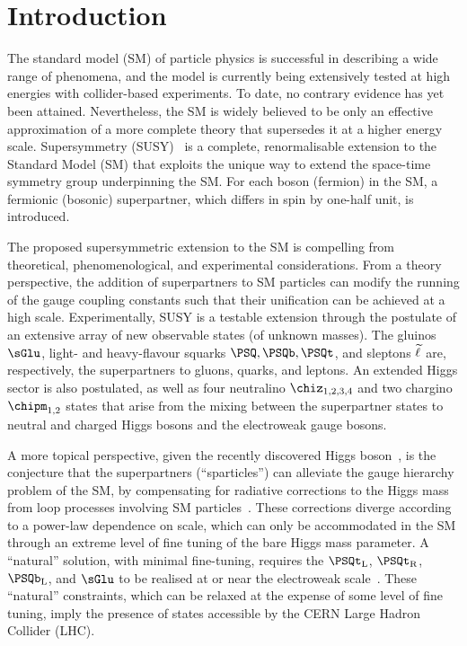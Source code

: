\section{Introduction}
\label{sec:introduction}

The standard model (SM) of particle physics is successful in
describing a wide range of phenomena, and the model is currently being
extensively tested at high energies with collider-based experiments.
To date, no contrary evidence has yet been attained. Nevertheless, the
SM is widely believed to be only an effective approximation of a more
complete theory that supersedes it at a higher energy
scale. Supersymmetry (SUSY)~\cite{ref:SUSY-1, ref:SUSY0, ref:SUSY1,
  ref:SUSY2, ref:SUSY3, ref:SUSY4} is a complete, renormalisable
extension to the Standard Model (SM) that exploits the unique way to
extend the space-time symmetry group underpinning the SM. For each
boson (fermion) in the SM, a fermionic (bosonic) superpartner, which
differs in spin by one-half unit, is introduced.

The proposed supersymmetric extension to the SM is compelling from
theoretical, phenomenological, and experimental considerations. From a
theory perspective, the addition of superpartners to SM particles can
modify the running of the gauge coupling constants such that their
unification can be achieved at a high scale. Experimentally, SUSY is a
testable extension through the postulate of an extensive array of new
observable states (of unknown masses). The gluinos $\sGlu$, light- and
heavy-flavour squarks $\PSQ, \PSQb, \PSQt$, and sleptons $\PSl$ are,
respectively, the superpartners to gluons, quarks, and leptons. An
extended Higgs sector is also postulated, as well as four neutralino
$\chiz_{1,2,3,4}$ and two chargino $\chipm_{1,2}$ states that arise
from the mixing between the superpartner states to neutral and charged
Higgs bosons and the electroweak gauge bosons. %

A more topical perspective, given the recently discovered Higgs
boson~\cite{ref:atlashiggsdiscovery, ref:cmshiggsdiscoverylong}, is
the conjecture that the superpartners (``sparticles'') can alleviate
the gauge hierarchy problem of the SM, by compensating for radiative
corrections to the Higgs mass from loop processes involving SM
particles~\cite{ref:hierarchy1, ref:hierarchy2}. These corrections
diverge according to a power-law dependence on scale, which can only
be accommodated in the SM through an extreme level of fine tuning of
the bare Higgs mass parameter. A ``natural'' solution, with minimal
fine-tuning, requires the $\PSQt_\text{L}$, $\PSQt_\text{R}$,
$\PSQb_\text{L}$, and $\sGlu$ to be realised at or near the
electroweak scale~\cite{ref:barbierinsusy}. These ``natural''
constraints, which can be relaxed at the expense of some level of fine
tuning, imply the presence of states accessible by the CERN Large
Hadron Collider (LHC). %

